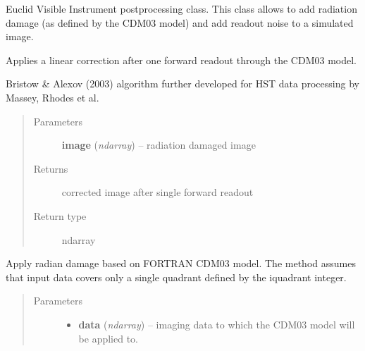 \documentclass[a4paper,11pt,english]{sphinxmanual}
\begin{document}
\begin{fulllineitems}
\label{postproc:postproc.postprocessing.PostProcessing}
Euclid Visible Instrument postprocessing class. This class allows
to add radiation damage (as defined by the CDM03 model) and add
readout noise to a simulated image.

\begin{fulllineitems}
\label{postproc:postproc.postprocessing.PostProcessing.applyLinearCorrection}
Applies a linear correction after one forward readout through the CDM03 model.

Bristow \& Alexov (2003) algorithm further developed for HST data
processing by Massey, Rhodes et al.
\begin{quote}\begin{description}
\item[{Parameters}] \leavevmode
\textbf{image} (\emph{ndarray}) -- radiation damaged image

\item[{Returns}] \leavevmode
corrected image after single forward readout

\item[{Return type}] \leavevmode
ndarray

\end{description}\end{quote}

\end{fulllineitems}


\begin{fulllineitems}
\label{postproc:postproc.postprocessing.PostProcessing.applyRadiationDamage}
Apply radian damage based on FORTRAN CDM03 model. The method assumes that
input data covers only a single quadrant defined by the iquadrant integer.
\begin{quote}\begin{description}
\item[{Parameters}] \leavevmode\begin{itemize}
\item {} 
\textbf{data} (\emph{ndarray}) -- imaging data to which the CDM03 model will be applied to.


\end{itemize}
\end{description}
\end{quote}
\end{fulllineitems}
\end{fulllineitems}
\end{document}
